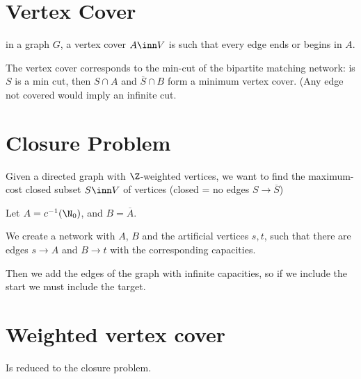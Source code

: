 \documentclass{article}
\begin{document}
	\section*{Vertex Cover}
	in a graph $G$, a vertex cover $A \inn V$ is such that every edge ends or begins in $A$.

	The vertex cover corresponds to the min-cut of the bipartite matching network: is $S$ is a min cut, then $S \cap A$ and $\overline S \cap B$ form a minimum vertex cover. (Any edge not covered would imply an infinite cut.

	\section*{Closure Problem}
	Given a directed graph with $\Z$-weighted vertices, we want to find the maximum-cost closed subset $S \inn V$ of vertices (closed = no edges $S \to \overline S$)

	Let $A = c^{-1}(\N_0)$, and $B = \overline A$.

	We create a network with $A$, $B$ and the artificial vertices $s, t$, such that there are edges $s \to A$ and $B \to t$ with the corresponding capacities.

	Then we add the edges of the graph with infinite capacities, so if we include the start we must include the target.

	\section*{Weighted vertex cover}
	Is reduced to the closure problem.
\end{document}
